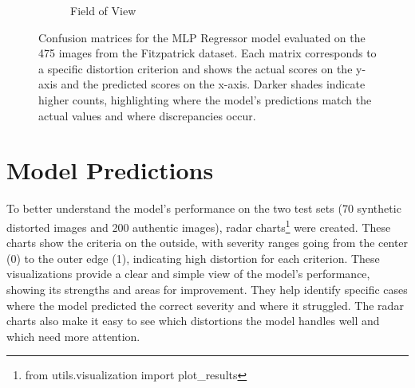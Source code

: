 \begin{figure}[ht]
\begin{subfigure}[b]{0.24\textwidth}
        \caption{Field of View}
        \label{fig:cm_fov}
    \end{subfigure}
    \caption{Confusion matrices for the MLP Regressor model evaluated on the 475 images from the Fitzpatrick dataset. Each matrix corresponds to a specific distortion criterion and shows the actual scores on the y-axis and the predicted scores on the x-axis. Darker shades indicate higher counts, highlighting where the model's predictions match the actual values and where discrepancies occur.}
    \label{fig:confusion_matrices}
\end{figure}
\vspace{\baselineskip}
\noindent

\clearpage
\section{Model Predictions}
\label{sec:VisualizingPredictions}
To better understand the model’s performance on the two test sets (70 synthetic distorted images and 200 authentic images), radar charts\footnote{from utils.visualization import plot\_results} were created. These charts show the criteria on the outside, with severity ranges going from the center (0) to the outer edge (1), indicating high distortion for each criterion. These visualizations provide a clear and simple view of the model’s performance, showing its strengths and areas for improvement. They help identify specific cases where the model predicted the correct severity and where it struggled. The radar charts also make it easy to see which distortions the model handles well and which need more attention. \par
